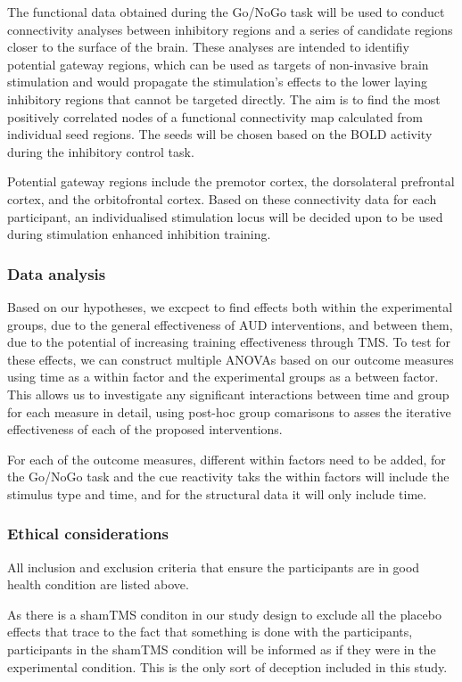 \documentclass[12pt]{article}
\begin{document}
The functional data obtained during the Go/NoGo task will be used to conduct connectivity analyses between inhibitory regions and a series of candidate regions closer to the surface of the brain. These analyses are intended to identifiy potential gateway regions, which can be used as targets of non-invasive brain stimulation and would propagate the stimulation's effects to the lower laying inhibitory regions that cannot be targeted directly. The aim is to find the most positively correlated nodes of a functional connectivity map calculated from individual seed regions. The seeds will be chosen based on the BOLD activity during the inhibitory control task.

Potential gateway regions include the premotor cortex, the dorsolateral prefrontal cortex, and the orbitofrontal cortex. Based on these connectivity data for each participant, an individualised stimulation locus will be decided upon to be used during stimulation enhanced inhibition training.

\subsubsection{Data analysis}

Based on our hypotheses, we excpect to find effects both within the experimental groups, due to the general effectiveness of AUD interventions, and between them, due to the potential of increasing training effectiveness through TMS. To test for these effects, we can construct multiple ANOVAs based on our outcome measures using time as a within factor and the experimental groups as a between factor. This allows us to investigate any significant interactions between time and group for each measure in detail, using post-hoc group comarisons to asses the iterative effectiveness of each of the proposed interventions.

For each of the outcome measures, different within factors need to be added, for the Go/NoGo task and the cue reactivity taks the within factors will include the stimulus type and time, and for the structural data it will only include time.

\subsubsection{Ethical considerations}
All inclusion and exclusion criteria that ensure the participants are in good health condition are listed above.

As there is a shamTMS conditon in our study design to exclude all the placebo effects that trace to the fact that something is done with the participants, participants in the shamTMS condition will be informed as if they were in the experimental condition. This is the only sort of deception included in this study. 
\end{document}
